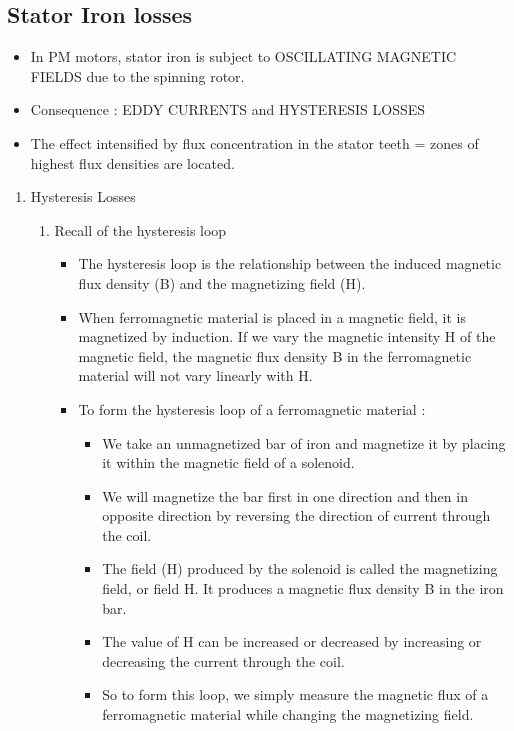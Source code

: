 \subsection{Stator Iron losses }
\begin{itemize}
    
\item 	In PM motors, stator iron is subject to OSCILLATING MAGNETIC FIELDS due to the spinning rotor.
\item 	Consequence :  EDDY CURRENTS and HYSTERESIS LOSSES
\item 	The effect intensified by flux concentration in the stator teeth = zones of highest flux densities are located.

\end{itemize}

\begin{enumerate}
    \item Hysteresis Losses
    \begin{enumerate}
        \item Recall of the hysteresis loop
        \begin{itemize}
            \item 	The hysteresis loop is the relationship between the induced magnetic flux density (B) and the magnetizing field (H).
            \item 	When ferromagnetic material is placed in a magnetic field, it is magnetized by induction. If we vary the magnetic intensity H of the magnetic field, the magnetic flux density B in the ferromagnetic material will not vary linearly with H.
            \item 	To form the hysteresis loop of a ferromagnetic material : 
            \begin{itemize}
                \item 	We take an unmagnetized bar of iron and magnetize it by placing it within the magnetic field of a solenoid. 
                \item 	We will magnetize the bar first in one direction and then in opposite direction by reversing the direction of current through the coil. 
                \item 	The field (H) produced by the solenoid is called the magnetizing field, or field H. It produces a magnetic flux density B in the iron bar. 
                \item 	The value of H can be increased or decreased by increasing or decreasing the current through the coil.
                \item 	So to form this loop, we simply measure the magnetic flux of a ferromagnetic material while changing the magnetizing field.


\end{itemize}
\end{itemize}
\end{enumerate}
\end{enumerate}
